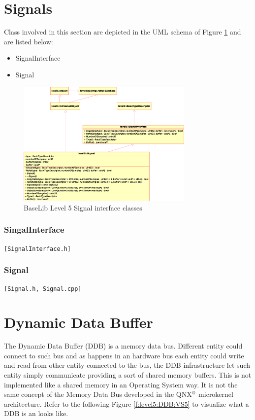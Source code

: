\section{Signals}

Class involved in this section are depicted in the UML schema of Figure \ref{f:level5:Signal} and are listed below:
\begin{itemize}
 \item SignalInterface
 \item Signal
\end{itemize}

\begin{figure}[h!]
 \begin{center}
  \includegraphics[width=0.77\textwidth]{level5/level5-Signal.eps}
  \caption{BaseLib Level 5 Signal interface classes}
  \label{f:level5:Signal}
 \end{center}
\end{figure}



\subsubsection{SingalInterface}
\texttt{[SignalInterface.h]}\\

\subsubsection{Signal}
\texttt{[Signal.h, Signal.cpp]}\\



\section{Dynamic Data Buffer}
The Dynamic Data Buffer (DDB) is a memory data bus. Different entity could connect to such bus and as happens in an hardware bus each entity could write and read from other entity connected to the bus, the DDB infrastructure let such entity simply communicate providing a sort of shared memory buffers. This is not implemented like a shared memory in an Operating System way. It is not the same concept of the Memory Data Bus developed in the QNX$^\copyright$ microkernel architecture. Refer to the following Figure \ref{f:level5:DDB:VS5} to visualize what a DDB is an looks like.

